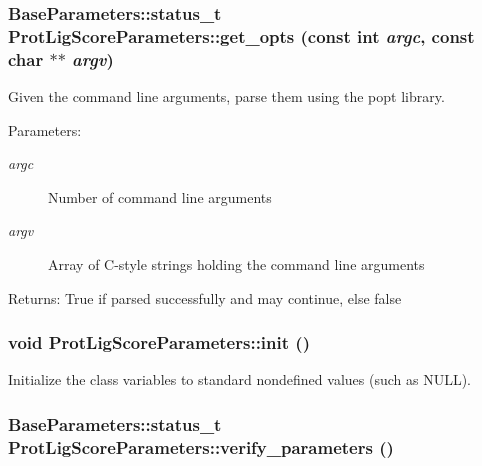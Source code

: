 \subsubsection{\setlength{\rightskip}{0pt plus 5cm}Base\-Parameters::status\_\-t Prot\-Lig\-Score\-Parameters::get\_\-opts (const int {\em argc}, const char $\ast$$\ast$ {\em argv})\hspace{0.3cm}{\tt  [private]}}\label{classSimSite3D_1_1ProtLigScoreParameters_586a96295f8218894484a4e67a903ece}


Given the command line arguments, parse them using the popt library. 

\begin{Desc}
\item[Parameters:]
\begin{description}
\item[{\em argc}]Number of command line arguments \item[{\em argv}]Array of C-style strings holding the command line arguments \end{description}
\end{Desc}
\begin{Desc}
\item[Returns:]True if parsed successfully and may continue, else false \end{Desc}
\subsubsection{\setlength{\rightskip}{0pt plus 5cm}void Prot\-Lig\-Score\-Parameters::init ()\hspace{0.3cm}{\tt  [private]}}\label{classSimSite3D_1_1ProtLigScoreParameters_71e62166bebd8b6192f7910fe3e30acb}


Initialize the class variables to standard nondefined values (such as NULL). 
\subsubsection{\setlength{\rightskip}{0pt plus 5cm}Base\-Parameters::status\_\-t Prot\-Lig\-Score\-Parameters::verify\_\-parameters ()\hspace{0.3cm}{\tt  [private]}}\label{classSimSite3D_1_1ProtLigScoreParameters_84006aef52335c65ce3c9e41eca9282d}


